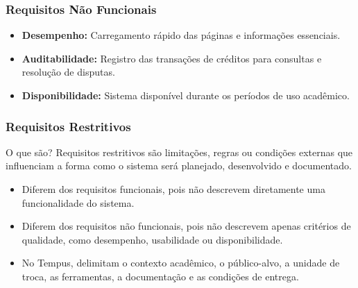 \documentclass[aspectratio=169]{beamer}
\begin{document}
\begin{frame}
\frametitle{Requisitos Não Funcionais}

\begin{itemize}
    \item \textbf{Desempenho:} Carregamento rápido das páginas e informações essenciais.

    \item \textbf{Auditabilidade:} Registro das transações de créditos para consultas e resolução de disputas.

    \item \textbf{Disponibilidade:} Sistema disponível durante os períodos de uso acadêmico.
\end{itemize}

\end{frame}

\begin{frame}
\frametitle{Requisitos Restritivos}

\begin{block}{O que são?}
Requisitos restritivos são limitações, regras ou condições externas que influenciam a forma como o sistema será planejado, desenvolvido e documentado.
\end{block}

\begin{itemize}
    \item Diferem dos requisitos funcionais, pois não descrevem diretamente uma funcionalidade do sistema.
    
    \item Diferem dos requisitos não funcionais, pois não descrevem apenas critérios de qualidade, como desempenho, usabilidade ou disponibilidade.
    
    \item No Tempus, delimitam o contexto acadêmico, o público-alvo, a unidade de troca, as ferramentas, a documentação e as condições de entrega.
\end{itemize}

\end{frame}
\end{document}
